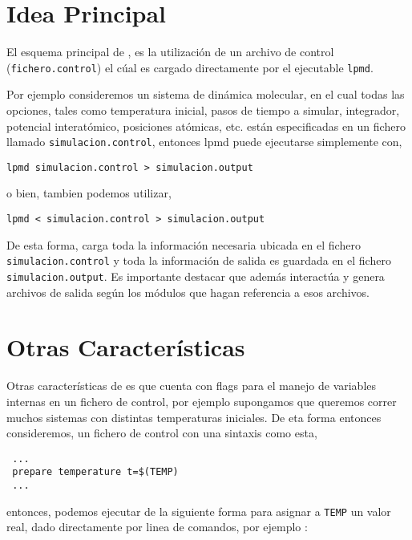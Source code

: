 \section{Idea Principal}

El esquema principal de \lpmd, es la utilizaci\'on de un archivo de control (\verb|fichero.control|) el c\'ual es cargado directamente por el ejecutable \verb|lpmd|.

Por ejemplo consideremos un sistema de din\'amica molecular, en el cual todas las opciones, tales como temperatura inicial, pasos de tiempo a simular, integrador, potencial interat\'omico, posiciones at\'omicas, etc. est\'an especificadas en un fichero llamado \verb|simulacion.control|, entonces lpmd puede ejecutarse simplemente con,

\begin{center}
 \texttt{lpmd simulacion.control > simulacion.output}
\end{center}

o bien, tambien podemos utilizar,

\begin{center}
 \texttt{lpmd < simulacion.control > simulacion.output}
\end{center}

De esta forma, \lpmd carga toda la informaci\'on necesaria ubicada en el fichero \verb|simulacion.control| y toda la informaci\'on de salida es guardada en el fichero \verb|simulacion.output|. Es importante destacar que \lpmd adem\'as interact\'ua y genera archivos de salida seg\'un los m\'odulos que hagan referencia a esos archivos.

\section{Otras Caracter\'isticas}

Otras caracter\'isticas de \lpmd es que cuenta con flags para el manejo de variables internas en un fichero de control, por ejemplo supongamos que queremos correr muchos sistemas con distintas temperaturas iniciales. De eta forma entonces consideremos, un fichero de control con una sintaxis como esta,

\begin{verbatim}
 ...
 prepare temperature t=$(TEMP)
 ...
\end{verbatim}

entonces, podemos ejecutar \lpmd de la siguiente forma para asignar a \verb|TEMP| un valor real, dado directamente por linea de comandos, por ejemplo :

